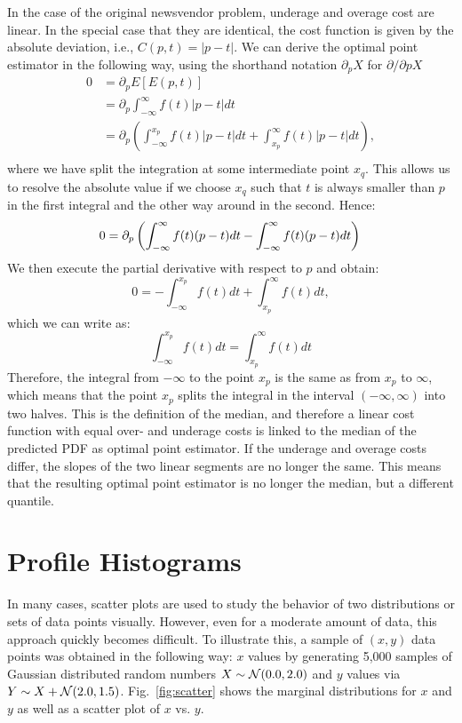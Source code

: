 \documentclass[BCOR=1mm, DIV=calc,10pt,
twoside=true,
twocolumn,
headings=normal]{scrartcl}
\newcommand{\fig}{Fig.~}
\begin{document}
In the case of the original newsvendor problem, underage and overage cost are linear. In the special case that they are identical, the cost function is given by the absolute deviation, i.e., $C(p,t) = |p-t|$.
We can derive the optimal point estimator in the following way, using the shorthand notation $\partial_p X$ for $\partial/\partial p X$
\begin{align*}
0 &= \partial_p E[E(p,t)]  \\
&= \partial_p \int_{-\infty}^\infty f(t) |p-t| dt \\
&= \partial_p \left ( \int_{-\infty}^{x_p} f(t) |p-t| dt +  \int_{x_p}^\infty f(t) |p-t| dt \right ), \\
\end{align*}
where we have split the integration at some intermediate point $x_q$. This allows us to resolve the absolute value if we choose $x_q$ such that $t$ is always smaller than $p$ in the first integral and the other way around in the second. Hence:
\begin{equation}
0 = \partial_p \left ( \int_{-\infty}^\infty f(t) (p-t) dt -  \int_{-\infty}^\infty f(t) (p-t) dt \right ) \\
\end{equation}
We then execute the partial derivative with respect to $p$ and obtain:
\begin{equation}
0 = -  \int_{-\infty}^{x_p} f(t) dt + \int_{x_p}^\infty f(t)  dt,
\end{equation}
which we can write as:
\begin{equation}
 \int_{-\infty}^{x_p} f(t) dt = \int_{x_p}^\infty f(t)  dt
\end{equation}
Therefore, the integral from $-\infty$ to the point $x_p$ is the same as from $x_p$ to $\infty$, which means that the point $x_p$ splits the integral in the interval $(-\infty, \infty)$ into two halves. This is the definition of the median, and therefore a linear cost function with equal over- and underage costs is linked to the median of the predicted PDF as optimal point estimator. If the underage and overage costs differ, the slopes of the two linear segments are no longer the same. This means that the resulting optimal point estimator is no longer the median, but a different quantile. 

\section{Profile Histograms}
\label{sec:profile}

In many cases, scatter plots are used to study the behavior of two distributions or sets of data points visually. However, even for a moderate amount of data, this approach quickly becomes difficult. To illustrate this, a sample of $(x,y)$ data points was obtained in the following way: $x$ values by generating 5,000 samples of Gaussian distributed random numbers $X \sim {\cal N}(0.0,2.0)$ and $y$ values via $Y \sim X +  {\cal N}(2.0,1.5)$. \fig \ref{fig:scatter} shows the marginal distributions for $x$ and $y$ as well as a scatter plot of $x$ vs. $y$.
\end{document}
